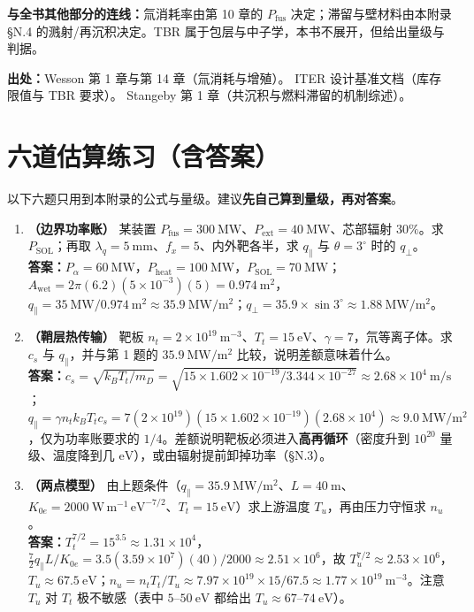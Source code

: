 \textbf{与全书其他部分的连线：}氚消耗率由第 10 章的 $P_{\mathrm{fus}}$ 决定；滞留与壁材料由本附录 \S N.4 的溅射/再沉积决定。TBR 属于包层与中子学，本书不展开，但给出量级与判据。

{\footnotesize
\textbf{出处：}Wesson 第 1 章与第 14 章（氚消耗与增殖）。
ITER 设计基准文档（库存限值与 TBR 要求）。
Stangeby 第 1 章（共沉积与燃料滞留的机制综述）。
}


\section{六道估算练习（含答案）}

以下六题只用到本附录的公式与量级。建议\textbf{先自己算到量级，再对答案}。

\begin{enumerate}
\item \textbf{（边界功率账）} 某装置 $P_{\mathrm{fus}}=300\ \mathrm{MW}$、$P_{\mathrm{ext}}=40\ \mathrm{MW}$、芯部辐射 $30\%$。求 $P_{\mathrm{SOL}}$；再取 $\lambda_q=5\ \mathrm{mm}$、$f_x=5$、内外靶各半，求 $q_\parallel$ 与 $\theta=3^\circ$ 时的 $q_\perp$。\\
\textbf{答案：}$P_\alpha=60\ \mathrm{MW}$，$P_{\mathrm{heat}}=100\ \mathrm{MW}$，$P_{\mathrm{SOL}}=70\ \mathrm{MW}$；$A_{\mathrm{wet}}=2\pi(6.2)(5\times10^{-3})(5)=0.974\ \mathrm{m^2}$，$q_\parallel=35\ \mathrm{MW}/0.974\ \mathrm{m^2}\approx35.9\ \mathrm{MW/m^2}$；$q_\perp=35.9\times\sin3^\circ\approx1.88\ \mathrm{MW/m^2}$。

\item \textbf{（鞘层热传输）} 靶板 $n_t=2\times10^{19}\ \mathrm{m^{-3}}$、$T_t=15\ \mathrm{eV}$、$\gamma=7$，氘等离子体。求 $c_s$ 与 $q_\parallel$，并与第 1 题的 $35.9\ \mathrm{MW/m^2}$ 比较，说明差额意味着什么。\\
\textbf{答案：}$c_s=\sqrt{k_BT_t/m_D}=\sqrt{15\times1.602\times10^{-19}/3.344\times10^{-27}}\approx2.68\times10^{4}\ \mathrm{m/s}$；$q_\parallel=\gamma n_tk_BT_tc_s=7(2\times10^{19})(15\times1.602\times10^{-19})(2.68\times10^{4})\approx9.0\ \mathrm{MW/m^2}$，仅为功率账要求的 $1/4$。差额说明靶板必须进入\textbf{高再循环}（密度升到 $10^{20}$ 量级、温度降到几 $\mathrm{eV}$），或由辐射提前卸掉功率（\S N.3）。

\item \textbf{（两点模型）} 由上题条件（$q_\parallel=35.9\ \mathrm{MW/m^2}$、$L=40\ \mathrm{m}$、$K_{0e}=2000\ \mathrm{W\,m^{-1}\,eV^{-7/2}}$、$T_t=15\ \mathrm{eV}$）求上游温度 $T_u$，再由压力守恒求 $n_u$。\\
\textbf{答案：}$T_t^{7/2}=15^{3.5}\approx1.31\times10^{4}$，$\frac72q_\parallel L/K_{0e}=3.5(3.59\times10^{7})(40)/2000\approx2.51\times10^{6}$，故 $T_u^{7/2}\approx2.53\times10^{6}$，$T_u\approx67.5\ \mathrm{eV}$；$n_u=n_tT_t/T_u\approx7.97\times10^{19}\times15/67.5\approx1.77\times10^{19}\ \mathrm{m^{-3}}$。注意 $T_u$ 对 $T_t$ 极不敏感（表中 $5$--$50\ \mathrm{eV}$ 都给出 $T_u\approx67$--$74\ \mathrm{eV}$）。


\end{enumerate}
